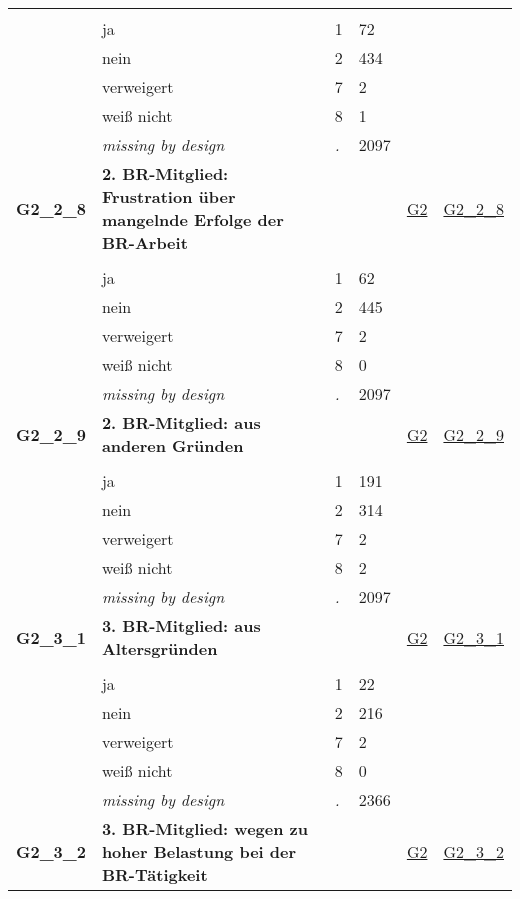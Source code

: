 \begin{longtable}{| L{2.45cm} | L{6cm} | C{1.5cm} | R{1cm} | C{2.25cm} | C{2.25cm} |}
   &  &  &  &  &  \\ 
   & ja & 1 & 72 &  &  \\ 
   & nein & 2 & 434 &  &  \\ 
   & verweigert & 7 & 2 &  &  \\ 
   & weiß nicht & 8 & 1 &  &  \\ 
   & \textit{missing by design} & \textit{.} & 2097 &  &  \\ 
   \midrule
\textbf{G2\_2\_8}\label{var:G2:2:8} & \textbf{2. BR-Mitglied: Frustration über mangelnde Erfolge der BR-Arbeit} &  &  & \hyperref[G2]{G2} & \hyperref[var:suf:G2:2:8]{G2\_2\_8} \\ 
   &  &  &  &  &  \\ 
   & ja & 1 & 62 &  &  \\ 
   & nein & 2 & 445 &  &  \\ 
   & verweigert & 7 & 2 &  &  \\ 
   & weiß nicht & 8 & 0 &  &  \\ 
   & \textit{missing by design} & \textit{.} & 2097 &  &  \\ 
   \midrule
\textbf{G2\_2\_9}\label{var:G2:2:9} & \textbf{2. BR-Mitglied: aus anderen Gründen} &  &  & \hyperref[G2]{G2} & \hyperref[var:suf:G2:2:9]{G2\_2\_9} \\ 
   &  &  &  &  &  \\ 
   & ja & 1 & 191 &  &  \\ 
   & nein & 2 & 314 &  &  \\ 
   & verweigert & 7 & 2 &  &  \\ 
   & weiß nicht & 8 & 2 &  &  \\ 
   & \textit{missing by design} & \textit{.} & 2097 &  &  \\ 
   \midrule
\textbf{G2\_3\_1}\label{var:G2:3:1} & \textbf{3. BR-Mitglied: aus Altersgründen} &  &  & \hyperref[G2]{G2} & \hyperref[var:suf:G2:3:1]{G2\_3\_1} \\ 
   &  &  &  &  &  \\ 
   & ja & 1 & 22 &  &  \\ 
   & nein & 2 & 216 &  &  \\ 
   & verweigert & 7 & 2 &  &  \\ 
   & weiß nicht & 8 & 0 &  &  \\ 
   & \textit{missing by design} & \textit{.} & 2366 &  &  \\ 
   \midrule
\textbf{G2\_3\_2}\label{var:G2:3:2} & \textbf{3. BR-Mitglied: wegen zu hoher Belastung bei der BR-Tätigkeit} &  &  & \hyperref[G2]{G2} & \hyperref[var:suf:G2:3:2]{G2\_3\_2} \\ 

\end{longtable}
